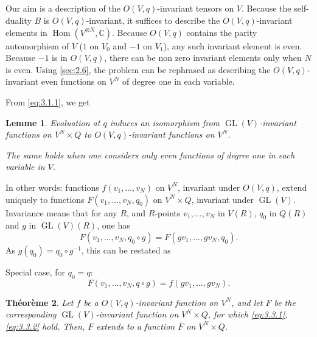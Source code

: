 \documentclass[11pt,a4paper]{article}
\theoremstyle{plain}
\newtheorem{theorem}{Th\'eor\`eme}
\newtheorem{lemma}[theorem]{Lemme}
\theoremstyle{definition}
\DeclareMathOperator{\Hom}{Hom}
\DeclareMathOperator{\GL}{GL}
\newcommand{\C}{\mathbb{C}}
\begin{document}
\subsection{}
Our aim is a description of the $O(V,q)$-invariant tensors on $V$. Because the self-duality $B$ is $O(V,q)$-invariant, it suffices to describe the $O(V,q)$-invariant elements in $\Hom(V^{\otimes N}, \C)$. Because $O(V,q)$ contains the parity automorphism of $V$ ($1$ on $V_0$ and $-1$ on $V_1$), any such invariant element is even. Because $-1$ is in $O(V,q)$, there can be non zero invariant elements only when $N$ is even. Using \ref{sec:2.6}, the problem can be rephrased as describing the $O(V,q)$-invariant even functions on $V^N$ of degree one in each variable.

From \eqref{eq:3.1.1}, we get

\begin{lemma}\label{lem:3.3}
Evaluation at $q$ induces an isomorphism from $\GL(V)$-invariant functions on $V^N \times Q$ to $O(V,q)$-invariant functions on $V^N$.

The same holds when one considers only even functions of degree one in each variable in $V$.
\end{lemma}

In other words: functions $f(v_1,\dots,v_N)$ on $V^N$, invariant under $O(V,q)$, extend uniquely to functions $F(v_1,\dots,v_N, q_0)$ on $V^N \times Q$, invariant under $\GL(V)$. Invariance means that for any $R$, and $R$-points $v_1,\dots,v_N$ in $V(R)$, $q_0$ in $Q(R)$ and $g$ in $\GL(V)(R)$, one has
\begin{equation}\label{eq:3.3.1}
F(v_1,\dots,v_N, q_0 \circ g) = F(gv_1,\dots,gv_N, q_0).
\end{equation}
As $g(q_0) = q_0 \circ g^{-1}$, this can be restated as

Special case, for $q_0 = q$:
\begin{equation}\label{eq:3.3.2}
F(v_1,\dots,v_N, q \circ g) = f(gv_1,\dots,gv_N).
\end{equation}

\begin{theorem}\label{thm:3.4}
Let $f$ be a $O(V,q)$-invariant function on $V^N$, and let $F$ be the corresponding $\GL(V)$-invariant function on $V^N \times Q$, for which \eqref{eq:3.3.1}, \eqref{eq:3.3.2} hold. Then, $F$ extends to a function $\overline{F}$ on $V^N \times \overline{Q}$.
\end{theorem}
\end{document}
